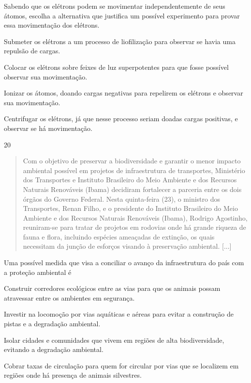 \pagebreak
Sabendo que os elétrons podem se movimentar independentemente de seus
átomos, escolha a alternativa que justifica um possível experimento para
provar essa movimentação dos elétrons.

\begin{escolha}
\item
  Submeter os elétrons a um processo de liofilização para observar se havia uma repulsão de cargas.
\item
  Colocar os elétrons sobre feixes de luz superpotentes para que fosse
  possível observar sua movimentação.
\item
  Ionizar os átomos, doando cargas negativas para repelirem os elétrons e
  observar sua movimentação.
\item
  Centrifugar os elétrons, já que nesse processo seriam doadas cargas
  positivas, e observar se há movimentação.
\end{escolha}

\num{20}
\begin{quote}
Com o objetivo de preservar a biodiversidade e garantir o menor
impacto ambiental possível em projetos de infraestrutura de
transportes, Ministério dos Transportes e Instituto Brasileiro do Meio
Ambiente e dos Recursos Naturais Renováveis (Ibama) decidiram
fortalecer a parceria entre os dois órgãos do Governo Federal. 
Nesta
quinta-feira (23), o ministro dos Transportes, Renan Filho, e o
presidente do Instituto Brasileiro do Meio Ambiente e dos Recursos
Naturais Renováveis (Ibama), Rodrigo Agostinho, reuniram-se para
tratar de projetos em rodovias onde há grande riqueza de fauna e
flora, incluindo espécies ameaçadas de extinção, os quais necessitam
da junção de esforços visando à preservação ambiental. [...]

\end{quote}

Uma possível medida que visa a conciliar o avanço da infraestrutura do país com a proteção ambiental é

\begin{escolha}
\item
  Construir corredores ecológicos entre as vias para que os animais
  possam atravessar entre os ambientes em segurança.
\item
  Investir na locomoção por vias aquáticas e aéreas para evitar a
  construção de pistas e a degradação ambiental.
\item
  Isolar cidades e comunidades que vivem em regiões de alta
  biodiversidade, evitando a degradação ambiental.
\item
  Cobrar taxas de circulação para quem for circular por vias que se
  localizem em regiões onde há presença de animais silvestres.
\end{escolha}

